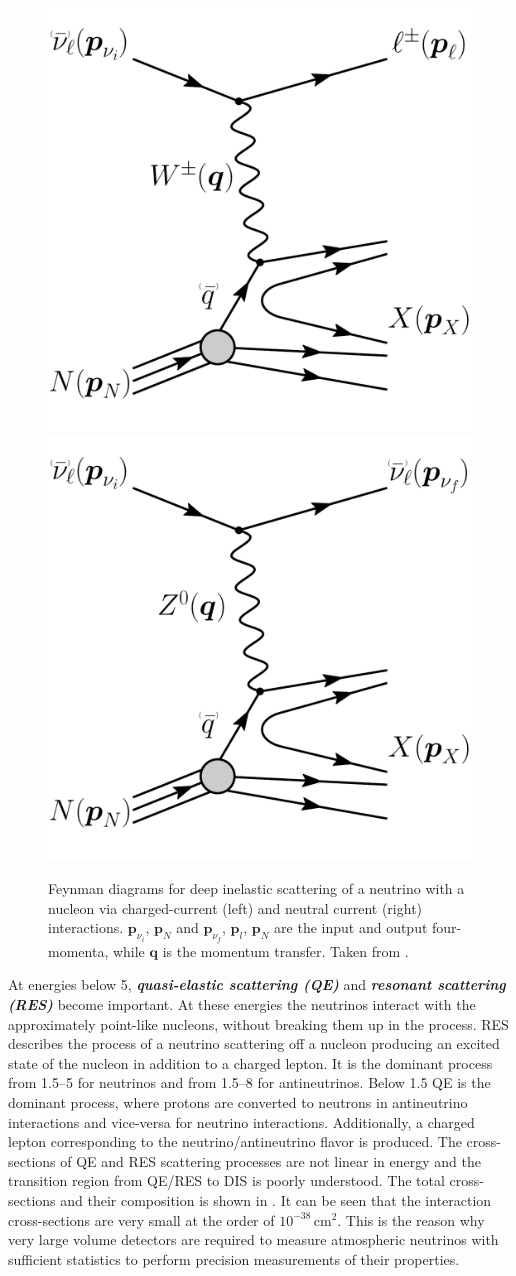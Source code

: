 \begin{figure}[h]
    \centering
    \includegraphics[width=0.4\linewidth]{figures/neutrinos_properties/feynman_DIS_CC_nu_new.pdf}
    \hspace{0.8cm}
    \includegraphics[width=0.4\linewidth]{figures/neutrinos_properties/feynman_DIS_NC_nu_new.pdf}
    \caption[Neutrino-nucleon deep inelastic scattering]{Feynman diagrams for deep inelastic scattering of a neutrino with a nucleon via charged-current (left) and neutral current (right) interactions. $\boldsymbol{p}_{\nu_i}$, $\boldsymbol{p}_{N}$ and $\boldsymbol{p}_{\nu_f}$, $\boldsymbol{p}_{l}$, $\boldsymbol{p}_{N}$ are the input and output four-momenta, while $\boldsymbol{q}$ is the momentum transfer. Taken from \cite{ATerliuk}.}
\end{figure}

At energies below \SI{5}{\gev}, \textbf{\textit{quasi-elastic scattering (QE)}} and \textbf{\textit{resonant scattering (RES)}} become important. At these energies the neutrinos interact with the approximately point-like nucleons, without breaking them up in the process. RES describes the process of a neutrino scattering off a nucleon producing an excited state of the nucleon in addition to a charged lepton. It is the dominant process from \SIrange{1.5}{5}{\gev} for neutrinos and from \SIrange{1.5}{8}{\gev} for antineutrinos. Below \SI{1.5}{\gev} QE is the dominant process, where protons are converted to neutrons in antineutrino interactions and vice-versa for neutrino interactions. Additionally, a charged lepton corresponding to the neutrino/antineutrino flavor is produced. The cross-sections of QE and RES scattering processes are not linear in energy and the transition region from QE/RES to DIS is poorly understood. The total cross-sections and their composition is shown in . It can be seen that the interaction cross-sections are very small at the order of $10^{-38}\mathrm{\,cm}^2$. This is the reason why very large volume detectors are required to measure atmospheric neutrinos with sufficient statistics to perform precision measurements of their properties.

